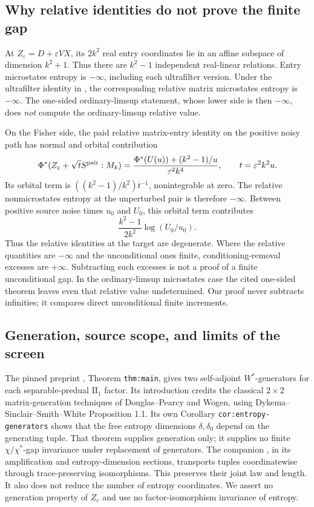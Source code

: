 \documentclass[11pt]{article}
\theoremstyle{definition}\newtheorem{definition}[theorem]{Definition}
\theoremstyle{remark}\newtheorem{remark}[theorem]{Remark}
\newcommand{\eps}{\varepsilon}\newcommand{\id}{\mathrm{id}}
\begin{document}
\subsection{Why relative identities do not prove the finite gap}
At $Z_\eps=D+\eps VX$, its $2k^2$ real entry coordinates lie in an
affine subspace of dimension $k^2+1$. Thus there are $k^2-1$
independent real-linear relations. Entry microstates entropy is
$-\infty$, including each ultrafilter version. Under the ultrafilter
identity in \cite[Theorem 5.1]{Shly}, the corresponding relative
matrix microstates entropy is $-\infty$. The one-sided
ordinary-limsup statement, whose lower side is then $-\infty$, does
\emph{not} compute the ordinary-limsup relative value.

On the Fisher side, the paid relative matrix-entry identity on the
positive noisy path has normal and orbital contribution
\[
 \Phi^*(Z_\eps+\sqrt t S^{\rm pair}:M_k)
 =\frac{\Phi^*(U(u))+(k^2-1)/u}{\eps^2k^4},
 \qquad t=\eps^2k^2u.
\]
Its orbital term is $((k^2-1)/k^2)t^{-1}$, nonintegrable at zero.
The relative nonmicrostates entropy at the unperturbed pair is
therefore $-\infty$. Between positive source noise times $u_0$ and
$U_0$, this orbital term contributes
\[
 \frac{k^2-1}{2k^2}\log(U_0/u_0).
\]
Thus the relative identities at the target are degenerate. Where the
relative quantities are $-\infty$ and the unconditional ones finite,
conditioning-removal excesses are $+\infty$. Subtracting such excesses
is not a proof of a finite unconditional gap. In the ordinary-limsup
microstates case the cited one-sided theorem leaves even that relative
value undetermined. Our proof never subtracts infinities; it compares
direct unconditional finite increments.

\subsection{Generation, source scope, and limits of the screen}
The pinned preprint \cite{generation}, Theorem \texttt{thm:main},
gives two self-adjoint $W^*$-generators for each separable-predual
$\mathrm{II}_1$ factor. Its introduction credits the classical
$2\times2$ matrix-generation techniques of Douglas--Pearcy and Wogen,
using Dykema--Sinclair--Smith--White Proposition 1.1. Its own
Corollary \texttt{cor:entropy-generators} shows that the free entropy
dimensions $\delta,\delta_0$ depend on the generating tuple.
That theorem supplies generation only; it supplies no finite
$\chi/\chi^*$-gap invariance under replacement of generators.
The companion \cite{source287}, in its amplification and
entropy-dimension sections, transports tuples coordinatewise through
trace-preserving isomorphisms. This preserves their joint law and
length. It also does not reduce the number of entropy coordinates.
We assert no generation property of $Z_\eps$ and use no
factor-isomorphism invariance of entropy.
\end{document}
